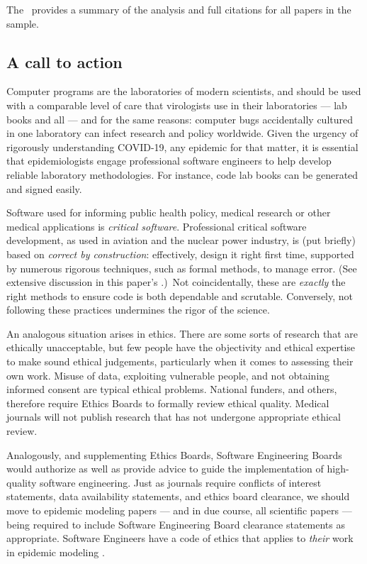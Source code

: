 The \supplement\ provides a summary of the analysis and full citations for all papers in the sample.

\subsection{A call to action}\label{summary}
Computer programs are the laboratories of modern scientists, and should be used with a comparable level of care that virologists use in their laboratories --- lab books and all \cite{notebooks} --- and for the same reasons: computer bugs accidentally cultured in one laboratory can infect research and policy worldwide. Given the urgency of rigorously understanding COVID-19, any epidemic for that matter, it is essential that epidemiologists engage professional software engineers to help develop reliable laboratory methodologies. For instance, code lab books can be generated and signed easily.

Software used for informing public health policy, medical research or other medical applications is \emph{critical software}. Professional critical software development, as used in aviation and the nuclear power industry, is (put briefly) based on \emph{correct by construction}: \cite{cbc} effectively, design it right first time, {supported by numerous rigorous techniques, such as formal methods, to manage error. (See extensive discussion in this paper's \supplement.)}\ Not coincidentally, these are \emph{exactly\/} the right methods to ensure code is both dependable and scrutable. Conversely, not following these practices undermines the rigor of the science.

An analogous situation arises in ethics. There are some sorts of research that are ethically unacceptable, but few people have the objectivity and ethical expertise to make sound ethical judgements, particularly when it comes to assessing their own work. Misuse of data, exploiting vulnerable people, and not obtaining informed consent are typical ethical problems. National funders, and others, therefore require Ethics Boards to formally review ethical quality. Medical journals will not publish research that has not undergone appropriate ethical review. 

Analogously, and supplementing Ethics Boards, Software Engineering Boards would authorize as well as provide advice to guide the implementation of high-quality software engineering. Just as journals require conflicts of interest statements, data availability statements, and ethics board clearance, we should move to epidemic modeling papers --- and in due course, all scientific papers --- being required to include Software Engineering Board clearance statements as appropriate. {Software Engineers have a code of ethics that applies to \emph{their\/} work in epidemic modeling \cite{ethics-code}.}

